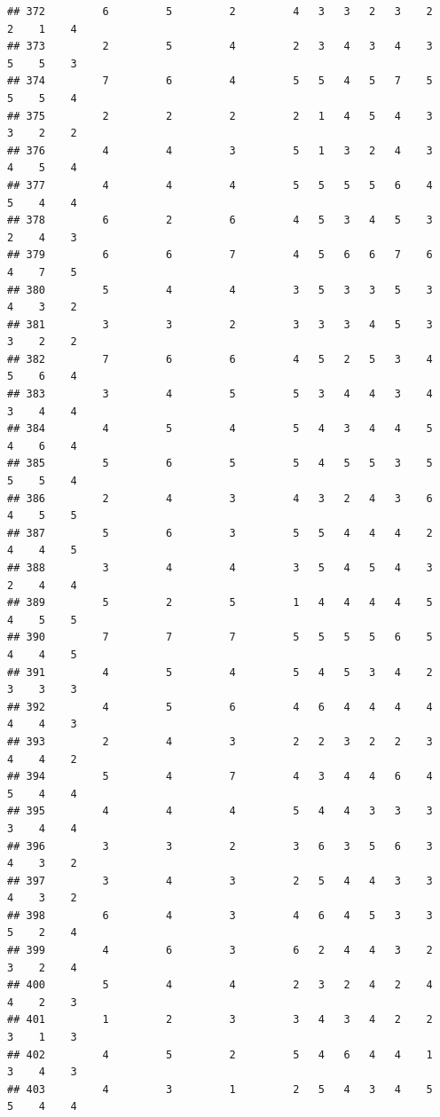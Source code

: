 \documentclass[
]{article}
\begin{document}
\begin{verbatim}
## 372         6         5         2         4   3   3   2   3    2    2    1    4
## 373         2         5         4         2   3   4   3   4    3    5    5    3
## 374         7         6         4         5   5   4   5   7    5    5    5    4
## 375         2         2         2         2   1   4   5   4    3    3    2    2
## 376         4         4         3         5   1   3   2   4    3    4    5    4
## 377         4         4         4         5   5   5   5   6    4    5    4    4
## 378         6         2         6         4   5   3   4   5    3    2    4    3
## 379         6         6         7         4   5   6   6   7    6    4    7    5
## 380         5         4         4         3   5   3   3   5    3    4    3    2
## 381         3         3         2         3   3   3   4   5    3    3    2    2
## 382         7         6         6         4   5   2   5   3    4    5    6    4
## 383         3         4         5         5   3   4   4   3    4    3    4    4
## 384         4         5         4         5   4   3   4   4    5    4    6    4
## 385         5         6         5         5   4   5   5   3    5    5    5    4
## 386         2         4         3         4   3   2   4   3    6    4    5    5
## 387         5         6         3         5   5   4   4   4    2    4    4    5
## 388         3         4         4         3   5   4   5   4    3    2    4    4
## 389         5         2         5         1   4   4   4   4    5    4    5    5
## 390         7         7         7         5   5   5   5   6    5    4    4    5
## 391         4         5         4         5   4   5   3   4    2    3    3    3
## 392         4         5         6         4   6   4   4   4    4    4    4    3
## 393         2         4         3         2   2   3   2   2    3    4    4    2
## 394         5         4         7         4   3   4   4   6    4    5    4    4
## 395         4         4         4         5   4   4   3   3    3    3    4    4
## 396         3         3         2         3   6   3   5   6    3    4    3    2
## 397         3         4         3         2   5   4   4   3    3    4    3    2
## 398         6         4         3         4   6   4   5   3    3    5    2    4
## 399         4         6         3         6   2   4   4   3    2    3    2    4
## 400         5         4         4         2   3   2   4   2    4    4    2    3
## 401         1         2         3         3   4   3   4   2    2    3    1    3
## 402         4         5         2         5   4   6   4   4    1    3    4    3
## 403         4         3         1         2   5   4   3   4    5    5    4    4

\end{verbatim}
\end{document}
